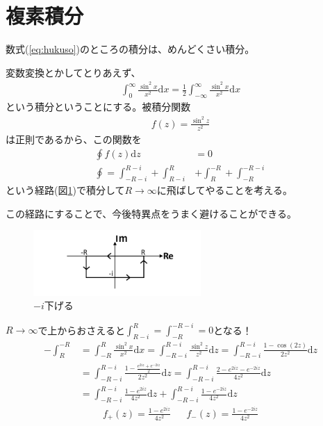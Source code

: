 \documentclass[11pt,b5paper,papersize,dvipdfmx]{jsbook}
\begin{document}
\section{複素積分}
数式(\ref{eq:hukuso})のところの積分は、めんどくさい積分。\par
変数変換とかしてとりあえず、
\begin{align}
    \int^\infty_0 \frac{\sin^2 x}{x^2}\mathrm{d}x = \frac{1}{2}\int^\infty_{-\infty} \frac{\sin^2 x}{x^2}\mathrm{d}x
\end{align}
という積分ということにする。被積分関数
\begin{align}
    f(z) = \frac{\sin^2z}{z^2}
\end{align}
は正則であるから、この関数を
\begin{align*}
    \oint f(z) \mathrm{d}z &= 0\\
    \oint = \int^{R-i}_{-R-i} + \int^{R}_{R-i} &+ \int^{-R}_{R} + \int^{-R-i}_{-R}
\end{align*}
という経路(図\ref{fig:sikaku})で積分して$R \to \infty$に飛ばしてやることを考える。\par
この経路にすることで、今後特異点をうまく避けることができる。
\begin{figure}[H]
    \centering
      \includegraphics[height=2.5cm]{kadono2/img/hukuso1.pdf}
      \caption{$-i$下げる}
      \label{fig:sikaku}
\end{figure}
$R \to \infty$で上からおさえると$\int^{R}_{R-i} = \int^{-R-i}_{-R} = 0$となる！
\begin{align}
    -\int^{-R}_{R} &= \int^{R}_{-R}\frac{\sin^2x}{x^2}\mathrm{d}x
    = \int^{R-i}_{-R-i}\frac{\sin^2z}{z^2}\mathrm{d}z
    = \int^{R-i}_{-R-i} \frac{1-\cos(2z)}{2z^2}\mathrm{d}z \nonumber\\
    &= \int^{R-i}_{-R-i} \frac{1-\frac{e^{2iz}+e^{-2iz}}{2}}{2z^2} \mathrm{d}z
    = \int^{R-i}_{-R-i} \frac{2-e^{2iz}-e^{-2iz}}{4z^2} \mathrm{d}z\nonumber\\
    &= \int^{R-i}_{-R-i} \frac{1-e^{2iz}}{4z^2} \mathrm{d}z + \int^{R-i}_{-R-i} \frac{1-e^{-2iz}}{4z^2} \mathrm{d}z
    \label{eq:huku}
\end{align}
\begin{align}
    f_+(z) = \frac{1-e^{2iz}}{4z^2} && f_-(z) = \frac{1-e^{-2iz}}{4z^2}\nonumber
\end{align}
\end{document}
